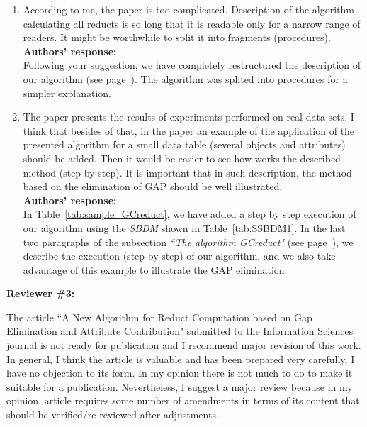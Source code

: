\documentclass{letter}
\begin{document}
\begin{letter}{}
\begin{enumerate}
	\item According to me, the paper is too complicated. Description of the algorithm calculating all reducts is so long that it is readable only for a narrow range of readers. It might be worthwhile to split it into fragments (procedures).\\
	\textbf{Authors’ response:} \\
	Following your suggestion, we have completely restructured the description of our algorithm (see page~\pageref{description}). The algorithm was splited into procedures for a simpler explanation.

	\item The paper presents the results of experiments performed on real data sets. I think that besides of that, in the paper an example of the application of the presented algorithm for a small data table (several objects and attributes) should be added. Then it would be easier to see how works the described method (step by step). It is important that in such description, the method based on the elimination of GAP should be well illustrated.\\
	\textbf{Authors’ response:} \\
	In Table~\ref{tab:sample_GCreduct}, we have added a step by step execution of our algorithm using  the \textit{SBDM} shown in Table~\ref{tab:SSBDM1}. In the last two paragraphs of the subsection \textit{``The algorithm GCreduct"} (see page~\pageref{par:step}), we describe the execution (step by step) of our algorithm, and we also take advantage of this example to illustrate the GAP elimination.
  \end{enumerate}    
  
  
  \textbf{Reviewer \#3:}
  
  The article ``A New Algorithm for Reduct Computation based on Gap Elimination and Attribute Contribution" submitted to the Information Sciences journal is not ready for publication and I recommend major revision of this work. In general, I think the article is valuable and has been prepared very carefully, I have no objection to its form. In my opinion there is not much to do to make it suitable for a publication. Nevertheless, I suggest a major review because in my opinion, article requires some number of amendments in terms of its content that should be verified/re-reviewed after adjustments.  
  

\end{letter}
\end{document}
